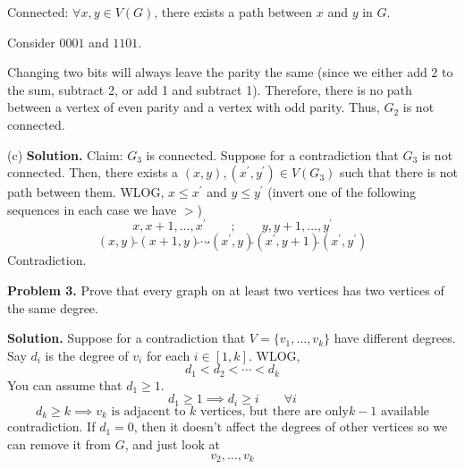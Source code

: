 Connected: $ \forall x,y\in V(G) $, there exists a path between
$ x $ and $ y $ in $ G $.

Consider $ 0001 $ and $ 1101 $.

Changing two bits will always leave the parity the same (since we either add 2
to the sum, subtract 2, or add 1 and subtract 1). Therefore, there is no path
between a vertex of even parity and a vertex with odd
parity. Thus, $ G_2 $ is not connected.

(c) \textbf{Solution.} Claim: $ G_3 $ is connected. Suppose for a contradiction that $ G_3 $
is not connected. Then, there exists a $ (x,y),(x^\prime,y^\prime)\in V(G_3) $
such that there is not path between them. WLOG, $ x\leqslant x^\prime $
and $ y\leqslant y^\prime $ (invert one of the following sequences
in each case we have $ > $)
\[ x,x+1,\ldots ,x^\prime \qquad;\qquad y,y+1,\ldots ,y^\prime \]
\[ (x,y)\tilde{} (x+1,y)\tilde{}\cdots\tilde{}(x^\prime,y)\tilde{} (x^\prime,y+1)\tilde{} (x^\prime,y^\prime) \]
Contradiction.

\textbf{Problem 3.} Prove that every graph on at least two vertices
has two vertices of the same degree.

\textbf{Solution.} Suppose for a contradiction that
$ V=\{v_1,\ldots ,v_k\} $ have different degrees. Say $ d_i $
is the degree of $ v_i $ for each $ i\in[1,k] $. WLOG,
\[ d_1<d_2<\cdots<d_k \]
You can assume that $ d_1\geqslant 1 $.
\[ d_1\geqslant 1 \implies d_i\geqslant i\qquad \forall i \]
\[ d_k\geqslant k \implies v_k\text{ is adjacent to $k$ vertices, but there are only
$k-1$ available} \]
contradiction. If $ d_1=0 $, then it doesn't affect the degrees
of other vertices so we can remove it from $ G $, and just look at
\[ v_2,\ldots,v_k \]
